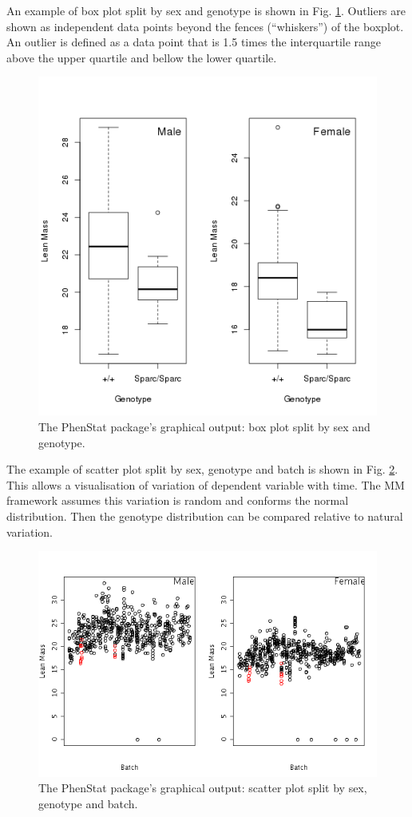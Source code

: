 \documentclass[12pt,a4paper]{article}
\begin{document}
An example of box plot split by sex and genotype is shown in Fig. \ref{fig:07}. Outliers are shown as independent data points beyond the fences (``whiskers'') of the boxplot. An outlier is defined as a data point that is 1.5 times the interquartile range above the upper quartile and bellow the lower quartile.
\begin{figure}[!htpb]%
\centerline{\includegraphics[scale=0.5]{boxplotSexGenotype.png}}
\caption{The PhenStat package's graphical output: box plot split by sex and genotype.}\label{fig:07}
\end{figure}

The example of scatter plot split by sex, genotype and batch is shown in Fig. \ref{fig:08}. This allows a visualisation of variation of dependent variable with time. The MM framework assumes this variation is random and conforms the normal distribution. Then the genotype distribution can be compared relative to natural variation. 
\begin{figure}[!htpb]%
\centerline{\includegraphics[scale=0.5]{scatterplotSexGenotypeBatch.png}}
\caption{The PhenStat package's graphical output: scatter plot split by sex, genotype and batch.}\label{fig:08}
\end{figure}
\end{document}
